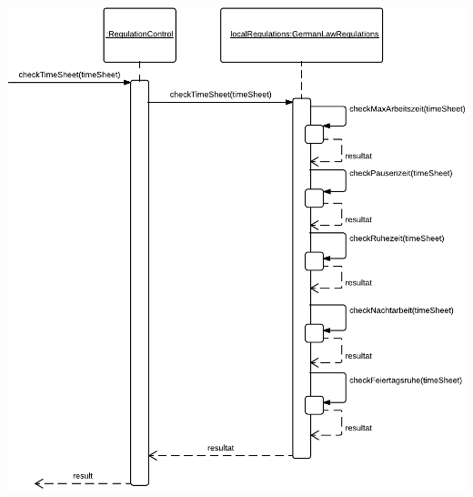         \includegraphics[width=\linewidth-2cm]{Diagramms/sequenzes/check_german_law_regulations.pdf}

